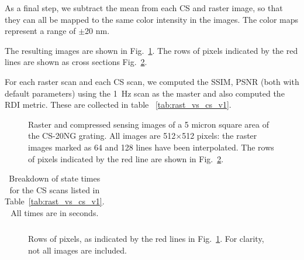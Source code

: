 \documentclass[twocolumn,oneside]{IEEEtran/IEEEtran}
\begin{document}
As a final step, we subtract the mean from each CS and raster image, so that
they can all be mapped to the same color intensity in the images. The color maps
represent a range of $\pm$20 nm.


The resulting images are shown in Fig.~\ref{fig:resultsF1_images}. The rows of
pixels indicated by the red lines are shown as cross sections Fig.~\ref{fig:pixel_rows}.

For each raster scan and each CS scan, we computed the SSIM, PSNR (both with
default parameters) using the 1~Hz scan as the master and also computed the RDI
metric. These are collected in table ~\ref{tab:rast_vs_cs_v1}.

\begin{figure}
  \centering
  
  \caption{Raster and compressed sensing images of a 5 micron square area of the
     CS-20NG grating. All images are 512$\times$512 pixels: the raster images marked as 64 and 128 lines have been interpolated. The rows of pixels
     indicated by the red line are shown in Fig.~\ref{fig:pixel_rows}.}
  \label{fig:resultsF1_images}
\end{figure}

%     

\begin{table}[t!]
  \centering
  \caption{Breakdown of state times for the CS scans listed in
    Table~\ref{tab:rast_vs_cs_v1}. All times are in seconds.}
  \label{tab:final_state_times}
  \begin{tabular}{ccccccc}
    
  \end{tabular}
\end{table}

\begin{figure}[t!]
  
  \caption{Rows of pixels, as indicated by the red lines in
    Fig.~\ref{fig:resultsF1_images}. For clarity, not all images are included.}
  \label{fig:pixel_rows}
\end{figure}
\end{document}
